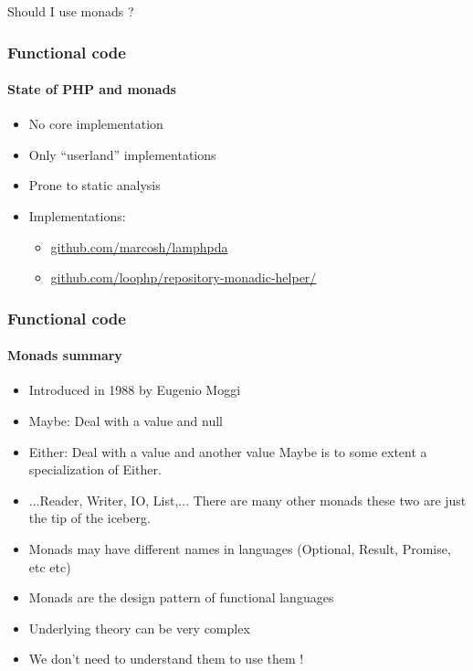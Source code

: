 \begin{frame}
  \centering
  \Huge Should I use monads ?

\end{frame}

\begin{frame}
  \frametitle{Functional code}
  \framesubtitle{State of PHP and monads}

  \begin{itemize}[<+->]
    \item No core implementation
    \item Only ``userland'' implementations
    \item Prone to static analysis
    \item Implementations:
          \begin{itemize}[<+->]
            \item \href{https://github.com/marcosh/lamphpda}{github.com/marcosh/lamphpda}
            \item \href{https://github.com/loophp/repository-monadic-helper/}{github.com/loophp/repository-monadic-helper/}
          \end{itemize}
  \end{itemize}
\end{frame}

\begin{frame}
  \frametitle{Functional code}
  \framesubtitle{Monads summary}

  \begin{itemize}
    \item Introduced in 1988 by Eugenio Moggi
    \item Maybe: Deal with a value and null
    \item Either: Deal with a value and another value
          Maybe is to some extent a specialization of Either.
    \item ...Reader, Writer, IO, List,... There are many other monads these
          two are just the tip of the iceberg.
    \item Monads may have different names in languages (Optional, Result, Promise, etc etc)
    \item Monads are the design pattern of functional languages
    \item Underlying theory can be very complex
    \item We don't need to understand them to use them !
  \end{itemize}
\end{frame}

